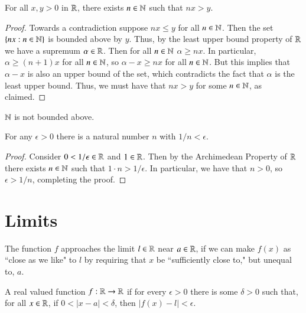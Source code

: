 \documentclass[12pt, a4paper, oneside, openright, titlepage]{book}
\begin{document}
\begin{thm}
    For all $x,y > 0$ in $\mathbb R$, there exists $n \in \mathbb N$ such that $nx > y$.
\end{thm}
\begin{proof}
    Towards a contradiction suppose $nx \leq y$ for all $n \in \mathbb N$. Then the set $\{nx: n \in \mathbb N\}$ is bounded above by $y$. Thus, by the least upper bound property of $\mathbb R$ we have a supremum $\alpha \in \mathbb R$. Then for all $n \in \mathbb N$ $\alpha \geq nx$. In particular, $\alpha \geq (n+1)x$ for all $n \in \mathbb N$, so $\alpha - x \geq nx$ for all $n \in \mathbb N$. But this implies that $\alpha - x$ is also an upper bound of the set, which contradicts the fact that $\alpha$ is the least upper bound. Thus, we must have that $nx > y$ for some $n \in \mathbb N$, as claimed.
\end{proof}

\begin{cor}
    $\mathbb N$ is not bounded above.
\end{cor}


\begin{cor}
    For any $\epsilon > 0$ there is a natural number $n$ with $1/n < \epsilon$.
\end{cor}
\begin{proof}
    Consider $0<1/\epsilon \in \mathbb R$ and $1 \in \mathbb R$. Then by the Archimedean Property of $\mathbb R$ there exists $n \in \mathbb N$ such that $1\cdot n > 1/\epsilon$. In particular, we have that $n > 0$, so $\epsilon > 1/n$, completing the proof.
\end{proof}




\section{Limits}

\begin{rmk}
    The function $f$ approaches the limit $l \in \mathbb R$ near $a \in \mathbb R$, if we can make $f(x)$ as ``close as we like" to $l$ by requiring that $x$ be ``sufficiently close to," but unequal to, $a.$
\end{rmk}

\begin{defn}[Limit]
    A real valued function $f:\mathbb R\rightarrow \mathbb R$  if for every $\epsilon > 0$ there is some $\delta > 0$ such that, for all $x \in \mathbb R$, if $0 < |x-a| < \delta$, then $|f(x) - l| < \epsilon$.
\end{defn}
\end{document}
